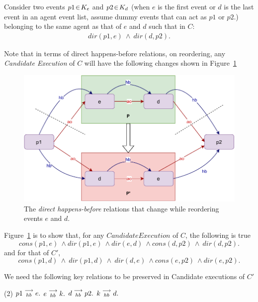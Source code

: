     Consider two events $p1\!\in\!K_e$ and $p2\!\in\!K_d$ (when $e$ is the first event or $d$ is the last event in an agent event list, assume dummy events that can act as $p1$ or $p2$.) belonging to the same agent as that of $e$ and $d$ such that in $C$:
    \begin{align*}
        dir(p1,e)\ \wedge\ dir(d,p2).
    \end{align*}
    
    Note that in terms of direct happens-before relations, on reordering, any \textit{Candidate Execution} of $C$ will have the following changes shown in Figure~\ref{reord:preserve_hb(b)}
    \begin{figure}[H]
        \centering
        \includegraphics[scale=0.7]{4.InstructionReordering/4.ValidReorderingCandidate/ProofParts/Part1/part1(b).pdf}
        \caption{The \textit{direct happens-before} relations that change while reordering events $e$ and $d$.}
        \label{reord:preserve_hb(b)}
    \end{figure}
    
    Figure~\ref{reord:preserve_hb(b)} is to show that, for any $Candidate Execution$ of $C$, the following is true
    \[
        cons(p1,e) \ \wedge dir(p1,e) \ \wedge dir(e,d) \ \wedge cons(d,p2) \ \wedge \ dir(d,p2).
    \]
    and for that of $C'$,
    \[
        cons(p1,d) \ \wedge \ dir(p1,d) \ \wedge \ dir(d,e) \ \wedge cons(e,p2) \ \wedge dir(e,p2).
    \]
    
    We need the following key relations to be preserved in Candidate executions of $C'$ 
    \begin{tasks}[style=enumerate](2)
        \task $p1\stackrel{\longrightarrow}{_{hb}}e.$
        \task $e\stackrel{\longrightarrow}{_{hb}}k.$
        \task $d\stackrel{\longrightarrow}{_{hb}}p2.$
        \task $k\stackrel{\longrightarrow}{_{hb}}d.$ 
    \end{tasks}

